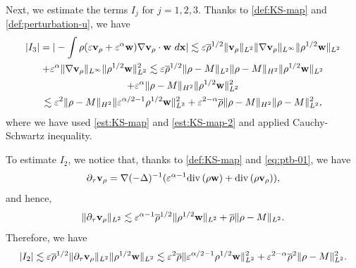 \documentclass[11pt]{article}
\theoremstyle{plain}
\theoremstyle{definition}
\theoremstyle{remark}
\newcommand{\dtau}{\partial_\tau}
\newcommand{\dv}{\mathrm{div}\, }
\renewcommand{\vec}[1]{{\bf #1}}
\newcommand{\idx}{\ d\vec x}
\newcommand{\norm}[2]{\Vert #1 \Vert_{#2}}
\numberwithin{equation}{section}
\begin{document}
\smallskip 

Next, we estimate the terms $ I_j $ for $ j = 1,2,3 $. Thanks to \eqref{def:KS-map} and \eqref{def:perturbation-u}, we have 
\begin{equation}
    \label{est:001-1}
    \begin{gathered}
        \vert I_3 \vert = \vert - \int \rho (\varepsilon \vec v_\rho + \varepsilon^\alpha \vec w) \nabla \vec v_\rho \cdot \vec w \idx \vert \lesssim \varepsilon \overline\rho^{1/2} \norm{\vec v_\rho}{L^2} \norm{\nabla \vec v_\rho}{L^\infty} \norm{\rho^{1/2} \vec w}{L^2} \\
         + \varepsilon^\alpha \norm{\nabla \vec v_\rho}{L^\infty} \norm{\rho^{1/2} \vec w}{L^2}^2 \lesssim \varepsilon \overline{\rho}^{1/2} \norm{\rho-M}{L^2} \norm{\rho-M}{H^2} \norm{\rho^{1/2} \vec w}{L^2} \\
         + \varepsilon^\alpha \norm{\rho-M}{H^2} \norm{\rho^{1/2} \vec w}{L^2}^2 \\
         \lesssim \varepsilon^{2} \norm{\rho - M}{H^2}  \norm{\varepsilon^{\alpha/2-1} \rho^{1/2} \vec w}{L^2}^2 + \varepsilon^{2-\alpha} \overline \rho  \norm{\rho -M}{H^2}\norm{\rho-M}{L^2}^2,
    \end{gathered}
\end{equation}
where we have used \eqref{est:KS-map} and \eqref{est:KS-map-2} and applied Cauchy-Schwartz inequality. 

To estimate $ I_2 $, we notice that, thanks to \eqref{def:KS-map} and \eqref{eq:ptb-01}, we have 
\begin{equation}
    \label{def:dtau-v-rho}
    \dtau \vec v_\rho  = \nabla (-\Delta)^{-1}( \varepsilon^{\alpha - 1} \dv (\rho \vec w) + \dv (\rho \vec v_\rho) ),
\end{equation}
and hence,
\begin{equation}\label{est:001-3}
    \norm{\dtau \vec v_\rho}{L^2} \lesssim \varepsilon^{\alpha - 1} \overline\rho^{1/2} \norm{\rho^{1/2} \vec w}{L^2} + \overline\rho\norm{\rho - M}{L^2}.
\end{equation}
Therefore, we have
\begin{equation}
    \label{est:001-4}
    \begin{gathered}
        \vert I_2 \vert \lesssim \varepsilon \overline\rho^{1/2} \norm{\dtau \vec v_\rho}{L^2} \norm{\rho^{1/2}\vec w}{L^2} \lesssim \varepsilon^{2} \overline\rho  \norm{\varepsilon^{\alpha/2-1} \rho^{1/2} \vec w}{L^2}^2 + \varepsilon^{2-\alpha} \overline\rho^2 \norm{\rho - M}{L^2}^2. 
    \end{gathered}
\end{equation}
\end{document}
